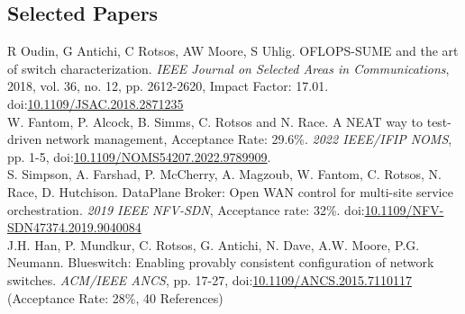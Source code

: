 \documentclass[10pt, a4paper]{article}
\newcommand{\DOI}[1]{doi:\href{https://doi.org/#1}{#1}}
\begin{document}
\subsection{Selected Papers}
\begin{EntriesList}

    R Oudin, G Antichi, C Rotsos, AW Moore, S Uhlig.
    OFLOPS-SUME and the art of switch characterization.
\emph{IEEE Journal on Selected Areas in Communications}, 2018, vol. 36, no. 12, pp.
2612-2620, Impact Factor: 17.01.  \DOI{10.1109/JSAC.2018.2871235} \newline
    \\
W. Fantom, P. Alcock, B. Simms, C. Rotsos and N. Race. A NEAT way to
test-driven network management, Acceptance Rate: 29.6\%. \emph{2022 IEEE/IFIP NOMS},
pp. 1-5, \DOI{10.1109/NOMS54207.2022.9789909}. \newline
\\
    S. Simpson, A. Farshad, P. McCherry, A. Magzoub, W. Fantom, C. Rotsos,
    N. Race, D. Hutchison.
    DataPlane Broker: Open WAN control for multi-site service orchestration.
\emph{2019 IEEE NFV-SDN}, Acceptance rate: 32\%.
\DOI{10.1109/NFV-SDN47374.2019.9040084} \newline
    \\
     J.H. Han, P. Mundkur, C. Rotsos, G. Antichi, N. Dave, A.W. Moore, P.G.  Neumann.
     Blueswitch: Enabling provably consistent configuration of network switches.
\emph{ACM/IEEE ANCS}, pp. 17-27, \DOI{10.1109/ANCS.2015.7110117} (Acceptance
Rate: 28\%, 40 References) \newline

\end{EntriesList}
\end{document}
